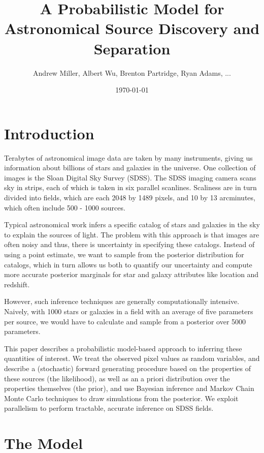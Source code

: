 \documentclass[11pt]{article}
\title{A Probabilistic Model for Astronomical Source Discovery and Separation}
\author{Andrew Miller, Albert Wu, Brenton Partridge, Ryan Adams, ...}
\date{\today}
\begin{document}
\maketitle
\tableofcontents
\newpage


\section{Introduction}

Terabytes of astronomical image data are taken by many instruments, giving us information about
billions of stars and galaxies in the universe. One collection of images is the Sloan Digital Sky Survey (SDSS).
The SDSS imaging camera scans sky in strips, each of which is taken in six parallel scanlines. Scaliness
are in turn divided into fields, which are each 2048 by 1489 pixels, and 10 by 13 arcminutes, which often
include 500 - 1000 sources.

Typical astronomical work infers a specific catalog of stars and galaxies in the sky to explain
the sources of light. The problem with this
approach is that images are often noisy and thus, there is uncertainty in specifying these catalogs.
Instead of using a point estimate, we want to sample from the posterior distribution for catalogs, which
in turn allows us both to quantify our uncertainty and compute more accurate posterior marginals for
star and galaxy attributes like location and redshift.

However, such inference techniques are generally computationally
intensive. Naively, with 1000 stars or galaxies in a field with an average of five parameters per
source, we would have to calculate
and sample from a posterior over 5000 parameters.

This paper describes a probabilistic model-based approach to inferring these quantities of interest.  We treat the observed pixel values as random variables, and describe a (stochastic) forward generating procedure based on the properties of these sources (the likelihood), as well as an a priori distribution over the properties themselves (the prior), and use Bayesian inference and Markov Chain Monte Carlo techniques to draw simulations from the posterior. We exploit parallelism to
perform tractable, accurate inference on SDSS fields.



\section{The Model}
\end{document}

